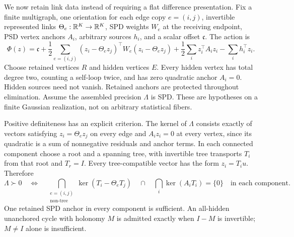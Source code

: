 We now retain link data instead of requiring a flat difference
presentation. Fix a finite multigraph, one orientation for each edge
copy \(e=(i,j)\), invertible represented links
\(\Theta_e:\mathbb R^K\to\mathbb R^K\), SPD weights \(W_e\) at the receiving
endpoint, PSD vertex anchors \(A_i\), arbitrary sources \(h_i\),
and a scalar offset \(\mathfrak c\). The action is
\begin{equation}
\Phi(z)=\mathfrak c
+\frac12\sum_{e=(i,j)}
(z_i-\Theta_ez_j)^\top W_e(z_i-\Theta_ez_j)
+\frac12\sum_i z_i^\top A_i z_i-\sum_i h_i^\top z_i.
\label{eq:cg-nonflat-series-action}
\end{equation}
Choose retained vertices \(R\) and hidden vertices \(E\).
Every hidden vertex has total degree two, counting a self-loop twice,
and has zero quadratic anchor \(A_i=0\). Hidden sources need not
vanish. Retained anchors are protected throughout elimination.
Assume the assembled precision \(\Lambda\) is SPD.
These are hypotheses on a finite Gaussian realization, not on
arbitrary statistical fibers. 

Positive definiteness has an explicit criterion. The kernel of
\(\Lambda\) consists exactly of vectors satisfying
\(z_i=\Theta_ez_j\) on every edge and \(A_iz_i=0\) at every
vertex, since its quadratic is a sum of nonnegative residuals and
anchor terms. In each connected component choose a root and a
spanning tree, with invertible tree transports \(T_i\) from that
root and \(T_r=I\). Every tree-compatible vector has the form
\(z_i=T_i u\). Therefore
\begin{equation}
\Lambda\succ0
\quad\Longleftrightarrow\quad
\bigcap_{\substack{e=(i,j)\\\text{non-tree}}}
\ker(T_i-\Theta_eT_j)
\quad\cap\quad\bigcap_i\ker(A_iT_i)=\{0\}
\quad\text{in each component}.
\label{eq:cg-nonflat-series-properness}
\end{equation}
One retained SPD anchor in every component is sufficient. An all-hidden
unanchored cycle with holonomy \(M\) is admitted exactly when
\(I-M\) is invertible; \(M\ne I\) alone is insufficient.

